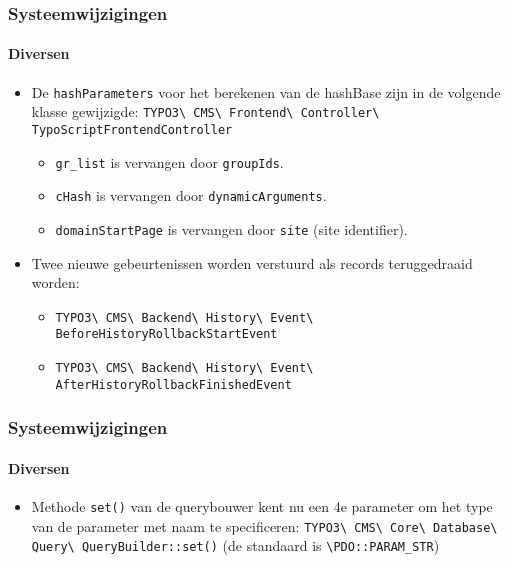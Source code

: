 \begin{frame}[fragile]
	\frametitle{Systeemwijzigingen}
	\framesubtitle{Diversen}

	\begin{itemize}
		\item De \texttt{hashParameters} voor het berekenen van de hashBase zijn in de volgende klasse gewijzigde:\newline
			\small
				\texttt{TYPO3\textbackslash
					CMS\textbackslash
					Frontend\textbackslash
					Controller\textbackslash
					TypoScriptFrontendController}
			\normalsize

			\begin{itemize}
				\item \texttt{gr\_list} is vervangen door \texttt{groupIds}.
				\item \texttt{cHash} is vervangen door \texttt{dynamicArguments}.
				\item \texttt{domainStartPage} is vervangen door \texttt{site} (site identifier).
			\end{itemize}

		\item Twee nieuwe gebeurtenissen worden verstuurd als records teruggedraaid worden:

			\begin{itemize}\smaller
				\item \texttt{TYPO3\textbackslash
					CMS\textbackslash
					Backend\textbackslash
					History\textbackslash
					Event\textbackslash
					BeforeHistoryRollbackStartEvent}
				\item \texttt{TYPO3\textbackslash
					CMS\textbackslash
					Backend\textbackslash
					History\textbackslash
					Event\textbackslash
					AfterHistoryRollbackFinishedEvent}
			\end{itemize}\normalsize

	\end{itemize}

\end{frame}


\begin{frame}[fragile]
	\frametitle{Systeemwijzigingen}
	\framesubtitle{Diversen}

	\begin{itemize}
		\item Methode \texttt{set()} van de querybouwer kent nu een 4e parameter
			om het type van de parameter met naam te specificeren:\newline
			\small
				\texttt{TYPO3\textbackslash
					CMS\textbackslash
					Core\textbackslash
					Database\textbackslash
					Query\textbackslash
					QueryBuilder::set()}
			\normalsize\newline
			\vspace{0.2cm}
			(de standaard is \texttt{\textbackslash PDO::PARAM\_STR})

	\end{itemize}

\end{frame}


